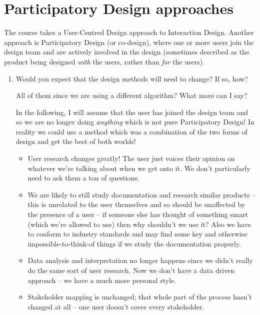 \documentclass[10pt,\jkfside,a4paper]{article}
\begin{document}
\section{Participatory Design approaches}

The course takes a User-Centred Design approach to Interaction Design.
Another approach is Participatory Design (or co-design), where one or more users join the design team and
are actively involved in the design (sometimes described as the product being designed
\textit{with} the users, rather than \textit{for} the users).

\begin{enumerate}[label=(\alph*)]

\item Would you expect that the design methods will need to change?
If so, how?

All of them since we are using a different algorithm?
What more can I say?

In the following, I will assume that the user has joined the design team and so we are no longer doing
\textit{anything} which is not pure Participatory Design! In reality we could use a method which was a combination of
the two forms of design and get the best of both worlds!

\begin{itemize}

\item User research changes greatly! The user just voices their opinion on whatever we're talking about
when we get onto it. We don't particularly need to ask them a ton of questions.

\item We are likely to still study documentation and research similar products -- this is unrelated to the user
themselves and so should be unaffected by the presence of a user -- if someone else has thought of something smart
(which we're allowed to use) then why shouldn't we use it? Also we have to conform to industry standards and may find
some key and otherwise impossible-to-think-of things if we study the documentation properly.

\item Data analysis and interpretation no longer happens since we didn't really do the same sort of user research.
Now we don't have a data driven approach -- we have a much more personal style.

\item Stakeholder mapping is unchanged; that whole part of the process hasn't changed at all -- one user doesn't
cover every stakeholder.


\end{itemize}
\end{enumerate}
\end{document}
